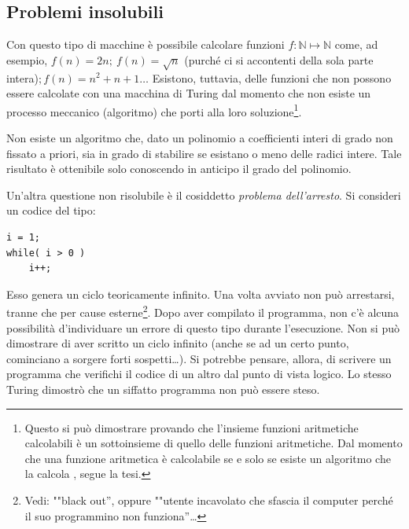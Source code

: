 		\subsection{Problemi insolubili}
		\label{subsec:ins}
Con questo tipo di macchine è possibile calcolare funzioni $f:\mathbb{N}\mapsto\mathbb{N}$ come, ad esempio, $f(n)=2n;\ f(n)=\sqrt{n}$ (purché ci si accontenti della sola parte intera)$; f(n)=n^2+n+1 \dots$ Esistono, tuttavia, delle funzioni che non possono essere calcolate con una macchina di Turing dal momento che non esiste un processo meccanico (algoritmo) che porti alla loro soluzione\footnote{Questo si può dimostrare provando che l'insieme funzioni aritmetiche calcolabili è un sottoinsieme di quello delle funzioni aritmetiche. Dal momento che una funzione aritmetica è calcolabile se e solo se esiste un algoritmo che la calcola \parencite{fp:comp}, segue la tesi.}.

Non  esiste un algoritmo che, dato un polinomio a coefficienti interi di grado non fissato a priori, sia in grado di stabilire se esistano o meno delle radici intere. Tale risultato è ottenibile solo conoscendo in anticipo il grado del polinomio.

Un'altra  questione non risolubile è il cosiddetto \emph{problema dell'arresto}. Si consideri un codice del tipo:
\begin{lstlisting}
i = 1;
while( i > 0 )
	i++;
\end{lstlisting}
Esso genera un ciclo teoricamente infinito. Una volta avviato non può arrestarsi, tranne che per cause esterne\footnote{Vedi: ""black out'', oppure ""utente incavolato che sfascia il computer perché il suo programmino non funziona''\dots}. Dopo aver compilato il programma, non c'è alcuna possibilità d'individuare un errore di questo tipo durante l'esecuzione. Non si può dimostrare di aver scritto un ciclo infinito (anche se ad un certo punto, cominciano a sorgere forti sospetti\dots). Si potrebbe pensare, allora, di scrivere un programma che verifichi il codice di un altro dal punto di vista logico. Lo stesso Turing dimostrò che un siffatto programma non può essere steso.

